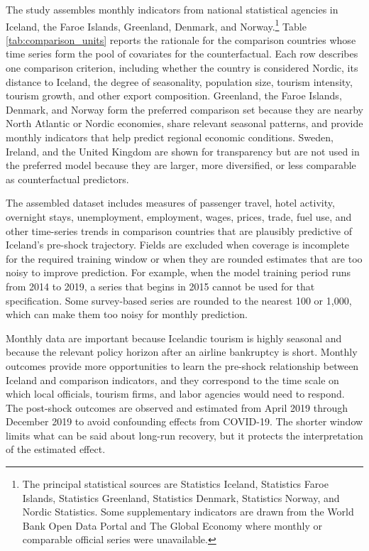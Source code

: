 \documentclass[12pt]{article}
\begin{document}
The study assembles monthly indicators from national statistical agencies in Iceland, the Faroe Islands, Greenland, Denmark, and Norway.\footnote{The principal statistical sources are Statistics Iceland, Statistics Faroe Islands, Statistics Greenland, Statistics Denmark, Statistics Norway, and Nordic Statistics. Some supplementary indicators are drawn from the World Bank Open Data Portal and The Global Economy where monthly or comparable official series were unavailable.} Table \ref{tab:comparison_units} reports the rationale for the comparison countries whose time series form the pool of covariates for the counterfactual. Each row describes one comparison criterion, including whether the country is considered Nordic, its distance to Iceland, the degree of seasonality, population size, tourism intensity, tourism growth, and other export composition. Greenland, the Faroe Islands, Denmark, and Norway form the preferred comparison set because they are nearby North Atlantic or Nordic economies, share relevant seasonal patterns, and provide monthly indicators that help predict regional economic conditions. Sweden, Ireland, and the United Kingdom are shown for transparency but are not used in the preferred model because they are larger, more diversified, or less comparable as counterfactual predictors.

The assembled dataset includes measures of passenger travel, hotel activity, overnight stays, unemployment, employment, wages, prices, trade, fuel use, and other time-series trends in comparison countries that are plausibly predictive of Iceland's pre-shock trajectory. Fields are excluded when coverage is incomplete for the required training window or when they are rounded estimates that are too noisy to improve prediction. For example, when the model training period runs from 2014 to 2019, a series that begins in 2015 cannot be used for that specification. Some survey-based series are rounded to the nearest 100 or 1,000, which can make them too noisy for monthly prediction.

Monthly data are important because Icelandic tourism is highly seasonal and because the relevant policy horizon after an airline bankruptcy is short. Monthly outcomes provide more opportunities to learn the pre-shock relationship between Iceland and comparison indicators, and they correspond to the time scale on which local officials, tourism firms, and labor agencies would need to respond. The post-shock outcomes are observed and estimated from April 2019 through December 2019 to avoid confounding effects from COVID-19. The shorter window limits what can be said about long-run recovery, but it protects the interpretation of the estimated effect.
\end{document}
